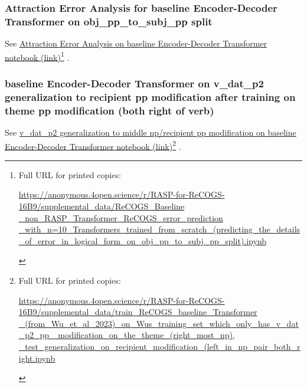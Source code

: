 \documentclass[11pt]{article}
\begin{document}
\subsubsection{Attraction Error Analysis for \cite{Wu2023} baseline Encoder-Decoder Transformer on obj\_pp\_to\_subj\_pp split}

See \href{https://anonymous.4open.science/r/RASP-for-ReCOGS-16B9/supplemental\_data/ReCOGS\_Baseline\_non\_RASP\_Transformer\_ReCOGS\_error\_prediction\_with\_n=10\_Transformers\_trained\_from\_scratch\_(predicting\_the\_details\_of\_error\_in\_logical\_form\_on\_obj\_pp\_to\_subj\_pp\_split).ipynb}{Attraction Error Analysis on baseline Encoder-Decoder Transformer notebook (link)}\footnote{\begin{footnotesize}Full URL for printed copies: 

\href{https://anonymous.4open.science/r/RASP-for-ReCOGS-16B9/supplemental\_data/ReCOGS\_Baseline\_non\_RASP\_Transformer\_ReCOGS\_error\_prediction\_with\_n=10\_Transformers\_trained\_from\_scratch\_(predicting\_the\_details\_of\_error\_in\_logical\_form\_on\_obj\_pp\_to\_subj\_pp\_split).ipynb}{https://anonymous.4open.science/r/RASP-for-ReCOGS-16B9/supplemental\_data/ReCOGS\_Baseline
\_non\_RASP\_Transformer\_ReCOGS\_error\_prediction
\_with\_n=10\_Transformers\_trained\_from\_scratch\_(predicting\_the\_details
\_of\_error\_in\_logical\_form\_on\_obj\_pp\_to\_subj\_pp\_split).ipynb}
\end{footnotesize}} .


\subsubsection{\cite{Wu2023} baseline Encoder-Decoder Transformer on v\_dat\_p2 generalization to recipient pp modification after training on theme pp modification (both right of verb)}


See \href{https://anonymous.4open.science/r/RASP-for-ReCOGS-16B9/supplemental\_data/train\_ReCOGS\_baseline\_Transformer\_(from\_Wu\_et\_al\_2023)\_on\_Wus\_training\_set\_which\_only\_has\_v\_dat\_p2\_pp\_modification\_on\_the\_theme\_(right\_most\_np),\_test\_generalization\_on\_recipient\_modification\_(left\_in\_np\_pair\_both\_right.ipynb}{v\_dat\_p2 generalization to middle np/recipient pp modification on baseline Encoder-Decoder Transformer notebook (link)}\footnote{\begin{footnotesize}Full URL for printed copies: 

\href{https://anonymous.4open.science/r/RASP-for-ReCOGS-16B9/supplemental\_data/train\_ReCOGS\_baseline\_Transformer\_(from\_Wu\_et\_al\_2023)\_on\_Wus\_training\_set\_which\_only\_has\_v\_dat\_p2\_pp\_modification\_on\_the\_theme\_(right\_most\_np),\_test\_generalization\_on\_recipient\_modification\_(left\_in\_np\_pair\_both\_right.ipynb}{https://anonymous.4open.science/r/RASP-for-ReCOGS-16B9/supplemental\_data/train\_ReCOGS\_baseline\_Transformer
\_(from\_Wu\_et\_al\_2023)\_on\_Wus\_training\_set\_which\_only\_has\_v\_dat\_p2\_pp
\_modification\_on\_the\_theme\_(right\_most\_np),
\_test\_generalization\_on\_recipient\_modification\_(left\_in\_np\_pair\_both\_right.ipynb}
\end{footnotesize}} .
\end{document}
